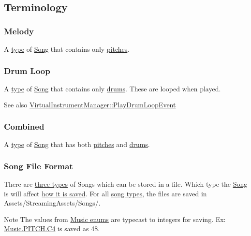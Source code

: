 \hypertarget{group___song_group_DocSongTerminology}{}\subsection{Terminology}\label{group___song_group_DocSongTerminology}
\hypertarget{group___song_group_DocSongMelody}{}\subsubsection{Melody}\label{group___song_group_DocSongMelody}
A \hyperlink{group___song_enums_gae681a1f001333e39fc1cb4fea97bfe1b}{type} of \hyperlink{class_song}{Song} that contains only \hyperlink{group___music_enums_ga508f69b199ea518f935486c990edac1d}{pitches}. \hypertarget{group___song_group_DocSongDrumLoop}{}\subsubsection{Drum Loop}\label{group___song_group_DocSongDrumLoop}
A \hyperlink{group___song_enums_gae681a1f001333e39fc1cb4fea97bfe1b}{type} of \hyperlink{class_song}{Song} that contains only \hyperlink{group___music_enums_gade475b4382c7066d1af13e7c13c029b6}{drums}. These are looped when played. \begin{DoxySeeAlso}{See also}
\hyperlink{group___v_i_m_event_types_class_virtual_instrument_manager_1_1_play_drum_loop_event}{Virtual\+Instrument\+Manager\+::\+Play\+Drum\+Loop\+Event} 
\end{DoxySeeAlso}
\hypertarget{group___song_group_DocSongCombined}{}\subsubsection{Combined}\label{group___song_group_DocSongCombined}
A \hyperlink{group___song_enums_gae681a1f001333e39fc1cb4fea97bfe1b}{type} of \hyperlink{class_song}{Song} that has both \hyperlink{group___music_enums_ga508f69b199ea518f935486c990edac1d}{pitches} and \hyperlink{group___music_enums_gade475b4382c7066d1af13e7c13c029b6}{drums}.\hypertarget{group___song_group_DocSongFileFormat}{}\subsubsection{Song File Format}\label{group___song_group_DocSongFileFormat}
There are \hyperlink{group___song_enums_gae681a1f001333e39fc1cb4fea97bfe1b}{three types} of Songs which can be stored in a file. Which type the \hyperlink{class_song}{Song} is will affect \hyperlink{group___song_pub_func_ga70b0f6021c3b0590c561a88e3d1e5c2f}{how it is saved}. For all \hyperlink{group___song_enums_gae681a1f001333e39fc1cb4fea97bfe1b}{song types}, the files are saved in Assets/\+Streaming\+Assets/\+Songs/. \begin{DoxyNote}{Note}
The values from \hyperlink{group___doc_music_DocMusicEnums}{Music enums} are typecast to integers for saving. Ex\+: \hyperlink{group___music_enums_gga508f69b199ea518f935486c990edac1dab713e6323a68d3ddabf4855826c50148}{Music.\+P\+I\+T\+C\+H.\+C4} is saved as 48.
\end{DoxyNote}
